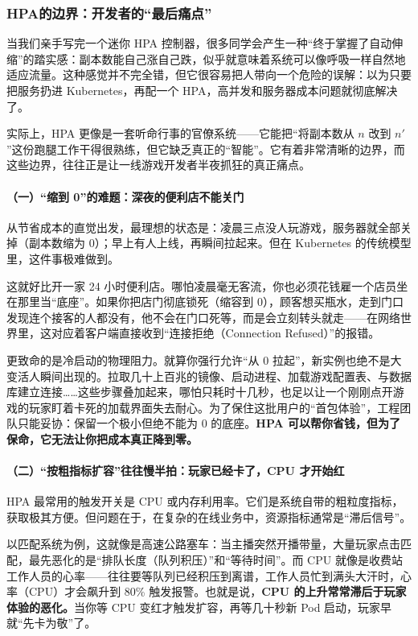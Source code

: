 \subsubsection{HPA的边界：开发者的“最后痛点”}

当我们亲手写完一个迷你 HPA 控制器，很多同学会产生一种“终于掌握了自动伸缩”的踏实感：副本数能自己涨自己跌，似乎就意味着系统可以像呼吸一样自然地适应流量。这种感觉并不完全错，但它很容易把人带向一个危险的误解：以为只要把服务扔进 Kubernetes，再配一个 HPA，高并发和服务器成本问题就彻底解决了。

实际上，HPA 更像是一套听命行事的官僚系统——它能把“将副本数从 $n$ 改到 $n'$”这份跑腿工作干得很熟练，但它缺乏真正的“智能”。它有着非常清晰的边界，而这些边界，往往正是让一线游戏开发者半夜抓狂的真正痛点。

\paragraph{（一）“缩到 0”的难题：深夜的便利店不能关门}

从节省成本的直觉出发，最理想的状态是：凌晨三点没人玩游戏，服务器就全部关掉（副本数缩为 0）；早上有人上线，再瞬间拉起来。但在 Kubernetes 的传统模型里，这件事极难做到。

这就好比开一家 24 小时便利店。哪怕凌晨毫无客流，你也必须花钱雇一个店员坐在那里当“底座”。如果你把店门彻底锁死（缩容到 0），顾客想买瓶水，走到门口发现连个接客的人都没有，他不会在门口死等，而是会立刻转头就走——在网络世界里，这对应着客户端直接收到“连接拒绝（Connection Refused）”的报错。

更致命的是冷启动的物理阻力。就算你强行允许“从 0 拉起”，新实例也绝不是大变活人瞬间出现的。拉取几十上百兆的镜像、启动进程、加载游戏配置表、与数据库建立连接……这些步骤叠加起来，哪怕只耗时十几秒，也足以让一个刚刚点开游戏的玩家盯着卡死的加载界面失去耐心。为了保住这批用户的“首包体验”，工程团队只能妥协：保留一个极小但绝不能为 0 的底座。\textbf{HPA 可以帮你省钱，但为了保命，它无法让你把成本真正降到零。}

\paragraph{（二）“按粗指标扩容”往往慢半拍：玩家已经卡了，CPU 才开始红}

HPA 最常用的触发开关是 CPU 或内存利用率。它们是系统自带的粗粒度指标，获取极其方便。但问题在于，在复杂的在线业务中，资源指标通常是“滞后信号”。

以匹配系统为例，这就像是高速公路塞车：当主播突然开播带量，大量玩家点击匹配，最先恶化的是“排队长度（队列积压）”和“等待时间”。而 CPU 就像是收费站工作人员的心率——往往要等队列已经积压到离谱，工作人员忙到满头大汗时，心率（CPU）才会飙升到 80\% 触发报警。也就是说，\textbf{CPU 的上升常常滞后于玩家体验的恶化。}当你等 CPU 变红才触发扩容，再等几十秒新 Pod 启动，玩家早就“先卡为敬”了。

